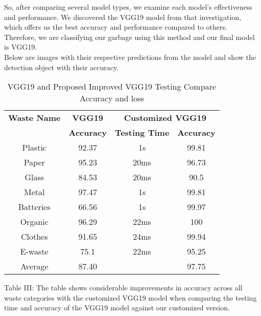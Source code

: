 \documentclass[conference]{IEEEtran}
\begin{document}
So, after comparing several model types, we examine each model's effectiveness and performance. We discovered the VGG19 model from that investigation, which offers us the best accuracy and performance compared to others. Therefore, we are classifying our garbage using this method and our final model is VGG19.\\
Below are images with their respective predictions from the model and show the detection object with their accuracy.

\begin{table}[htp]
\begin{center}
\caption{VGG19 and Proposed Improved  VGG19 Testing Compare Accuracy and loss}
\begin{tabular}{|c|c|cc|}
\hline
\multirow{}{}{\textbf{Waste Name}} & \textbf{VGG19}    & \multicolumn{2}{c|}{\textbf{Customized VGG19}}                 \\ \cline{2-4} 
                                    & \textbf{Accuracy} & \multicolumn{1}{c|}{\textbf{Testing Time}} & \textbf{Accuracy} \\ \hline
Plastic                             & 92.37             & \multicolumn{1}{c|}{1s}                    & 99.81             \\ \hline
Paper                               & 95.23             & \multicolumn{1}{c|}{20ms}                  & 96.73             \\ \hline
Glass                               & 84.53             & \multicolumn{1}{c|}{20ms}                  & 90.5              \\ \hline
Metal                               & 97.47             & \multicolumn{1}{c|}{1s}                    & 99.81             \\ \hline
Batteries                           & 66.56             & \multicolumn{1}{c|}{1s}                    & 99.97             \\ \hline
Organic                             & 96.29             & \multicolumn{1}{c|}{22ms}                  & 100               \\ \hline
Clothes                             & 91.65             & \multicolumn{1}{c|}{24ms}                  & 99.94             \\ \hline
E-waste                             & 75.1              & \multicolumn{1}{c|}{22ms}                  & 95.25             \\ \hline
Average                             &  87.40             & \multicolumn{1}{c|}{}                  & 97.75             \\ \hline

\end{tabular}
\end{center}

\label{VGG19 and Customized  VGG19 Testing Compare Accuracy and loss }
\end{table}
Table III: The table shows considerable improvements in accuracy across all waste categories with the customized VGG19 model when comparing the testing time and accuracy of the VGG19 model against our customized version.
\end{document}
